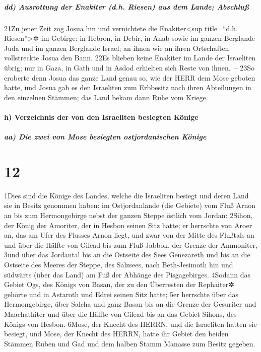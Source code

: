 \hypertarget{dd-ausrottung-der-enakiter-d.h.-riesen-aus-dem-lande-abschluuxdf}{%
\subparagraph{dd) Ausrottung der Enakiter (d.h. Riesen) aus dem Lande;
Abschluß}\label{dd-ausrottung-der-enakiter-d.h.-riesen-aus-dem-lande-abschluuxdf}}

21Zu jener Zeit zog Josua hin und vernichtete die Enakiter\textless sup
title=``d.h. Riesen''\textgreater✲ im Gebirge: in Hebron, in Debir, in
Anab sowie im ganzen Berglande Juda und im ganzen Berglande Israel; an
ihnen wie an ihren Ortschaften vollstreckte Josua den Bann. 22Es blieben
keine Enakiter im Lande der Israeliten übrig; nur in Gaza, in Gath und
in Asdod erhielten sich Reste von ihnen.~-- 23So eroberte denn Josua das
ganze Land genau so, wie der HERR dem Mose geboten hatte, und Josua gab
es den Israeliten zum Erbbesitz nach ihren Abteilungen in den einzelnen
Stämmen; das Land bekam dann Ruhe vom Kriege.

\hypertarget{h-verzeichnis-der-von-den-israeliten-besiegten-kuxf6nige}{%
\paragraph{h) Verzeichnis der von den Israeliten besiegten
Könige}\label{h-verzeichnis-der-von-den-israeliten-besiegten-kuxf6nige}}

\hypertarget{aa-die-zwei-von-mose-besiegten-ostjordanischen-kuxf6nige}{%
\subparagraph{aa) Die zwei von Mose besiegten ostjordanischen
Könige}\label{aa-die-zwei-von-mose-besiegten-ostjordanischen-kuxf6nige}}

\hypertarget{section-11}{%
\section{12}\label{section-11}}

1Dies sind die Könige des Landes, welche die Israeliten besiegt und
deren Land sie in Besitz genommen haben: im Ostjordanlande (die Gebiete)
vom Fluß Arnon an bis zum Hermongebirge nebst der ganzen Steppe östlich
vom Jordan: 2Sihon, der König der Amoriter, der in Hesbon seinen Sitz
hatte; er herrschte von Aroer an, das am Ufer des Flusses Arnon liegt,
und zwar von der Mitte des Flußtals an und über die Hälfte von Gilead
bis zum Fluß Jabbok, der Grenze der Ammoniter, 3und über das Jordantal
bis an die Ostseite des Sees Genezareth und bis an die Ostseite des
Meeres der Steppe, des Salzsees, nach Beth-Jesimoth hin und südwärts
(über das Land) am Fuß der Abhänge des Pisgagebirges. 4Sodann das Gebiet
Ogs, des Königs von Basan, der zu den Überresten der Rephaiter✲ gehörte
und in Astaroth und Edrei seinen Sitz hatte; 5er herrschte über das
Hermongebirge, über Salcha und ganz Basan bis an die Grenze der
Gesuriter und Maachathiter und über die Hälfte von Gilead bis an das
Gebiet Sihons, des Königs von Hesbon. 6Mose, der Knecht des HERRN, und
die Israeliten hatten sie besiegt, und Mose, der Knecht des HERRN, hatte
ihr Gebiet den beiden Stämmen Ruben und Gad und dem halben Stamm Manasse
zum Besitz gegeben.

